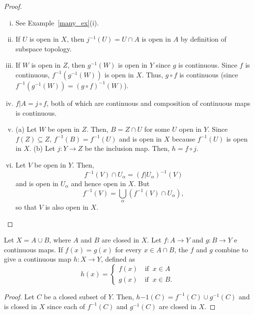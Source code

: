 \documentclass[a4paper,english,12pt]{article}
\begin{document}
\begin{proof}
\begin{enumerate}[i)]
\item See Example~\ref{many_ex}(i).
\item If $U$ is open in $X$, then $j^{-1}(U)=U\cap A$ is open in $A$ by definition of subspace topology.
\item If $W$ is open in $Z$, then $g^{-1}(W)$ is open in $Y$ since $g$ is continuous. Since $f$ is continuous, $f^{-1}(g^{-1}(W))$ is open in $X$. Thus, $g\circ f$ is continuous (since $f^{-1}(g^{-1}(W))=(g\circ f)^{-1}(W)$).
\item $f|A=j\circ f$, both of which are continuous and composition of continuous maps is continuous.
\item (a) Let $W$ be open in $Z$. Then, $B=Z\cap U$ for some $U$ open in $Y$. Since $f(Z)\subseteq Z$, $f^{-1}(B)=f^{-1}(U)$ and is open in $X$ because $f^{-1}(U)$ is open in $X$.
(b) Let $j:Y\to Z$ be the inclusion map. Then, $h=f\circ j$.
\item Let $V$ be open in $Y$. Then, 
\begin{equation*}
f^{-1}(V)\cap U_{\alpha}=(f|U_{\alpha})^{-1}(V)
\end{equation*}
and is open in $U_{\alpha}$ and hence open in $X$. But 
\begin{equation*}
f^{-1}(V)=\bigcup _{\alpha}\left( f^{-1}(V)\cap U_{\alpha}\right),
\end{equation*}
so that $V$ is also open in $X$.
\end{enumerate}
\end{proof}

\begin{thm}
Let $X=A\cup B$, where $A$ and $B$ are closed in $X$. Let $f:A\to Y$ and $g:B\to Y$ e continuous maps. If $f(x)=g(x)$ for every $x\in A\cap B$, the $f$ and $g$ combine to give a continuous map $h:X\to Y$, defined as 
\begin{equation*}
h(x)=\begin{cases} f(x) \quad \mathrm{if } \;\; x\in A \\ g(x) \quad \mathrm{if}\;\; x\in B.
\end{cases}
\end{equation*}
\end{thm}
\begin{proof}
Let $C$ be a closed subset of $Y$. Then, $h{-1}(C)=f^{-1}(C)\cup g^{-1}(C)$ and is closed in $X$ since each of $f^{-1}(C)$ and $g^{-1}(C)$ are closed in $X$.
\end{proof}
\end{document}
